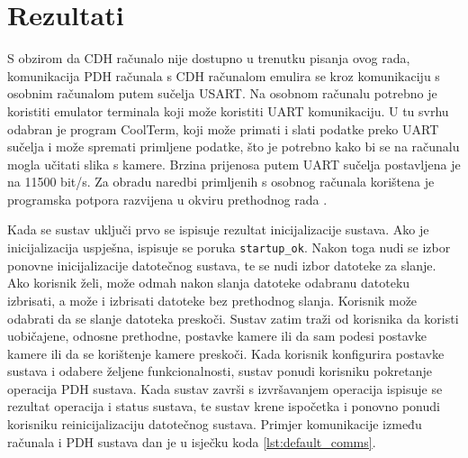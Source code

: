 \chapter{Rezultati}

S obzirom da CDH računalo nije dostupno u trenutku pisanja ovog rada,
komunikacija PDH računala s CDH računalom emulira se kroz komunikaciju s osobnim računalom
putem sučelja USART.
Na osobnom računalu potrebno je koristiti emulator terminala koji može koristiti UART komunikaciju. U tu svrhu odabran je program CoolTerm, 
koji može primati i slati podatke preko UART sučelja i može spremati  
primljene podatke, što je potrebno kako bi se na računalu mogla učitati slika s kamere. 
Brzina prijenosa putem UART sučelja postavljena je na 11500 bit/s.
Za obradu naredbi primljenih s osobnog računala korištena 
je programska potpora razvijena u okviru prethodnog rada \cite{diplomski_goran_petrak}.

Kada se sustav uključi prvo se ispisuje rezultat inicijalizacije sustava. Ako je inicijalizacija uspješna, ispisuje se poruka \verb|startup_ok|. Nakon toga nudi se izbor ponovne inicijalizacije datotečnog sustava, te se nudi izbor datoteke za slanje. Ako korisnik želi, može odmah nakon slanja datoteke odabranu datoteku izbrisati, a može i izbrisati datoteke bez prethodnog slanja. Korisnik može odabrati da se slanje datoteka preskoči. Sustav zatim traži od korisnika da koristi uobičajene, odnosne prethodne, postavke kamere ili da sam podesi postavke kamere ili da se korištenje kamere preskoči. Kada korisnik konfigurira postavke sustava i odabere željene funkcionalnosti,
sustav ponudi korisniku pokretanje operacija PDH sustava. Kada sustav završi s izvršavanjem operacija ispisuje se rezultat operacija i status sustava, te sustav krene ispočetka i ponovno ponudi korisniku reinicijalizaciju datotečnog sustava. Primjer komunikacije između računala i PDH sustava dan je u isječku koda \ref{lst:default_comms}.


